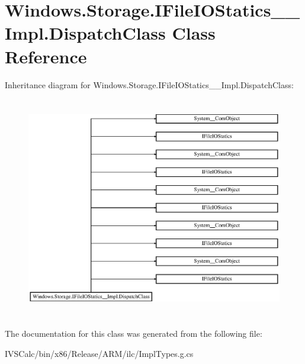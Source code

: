 \hypertarget{class_windows_1_1_storage_1_1_i_file_i_o_statics_____impl_1_1_dispatch_class}{}\section{Windows.\+Storage.\+I\+File\+I\+O\+Statics\+\_\+\+\_\+\+Impl.\+Dispatch\+Class Class Reference}
\label{class_windows_1_1_storage_1_1_i_file_i_o_statics_____impl_1_1_dispatch_class}
Inheritance diagram for Windows.\+Storage.\+I\+File\+I\+O\+Statics\+\_\+\+\_\+\+Impl.\+Dispatch\+Class\+:\begin{figure}[H]
\begin{center}
\leavevmode
\includegraphics[height=9.746835cm]{class_windows_1_1_storage_1_1_i_file_i_o_statics_____impl_1_1_dispatch_class}
\end{center}
\end{figure}


The documentation for this class was generated from the following file\+:\begin{DoxyCompactItemize}
\item 
I\+V\+S\+Calc/bin/x86/\+Release/\+A\+R\+M/ilc/Impl\+Types.\+g.\+cs\end{DoxyCompactItemize}
